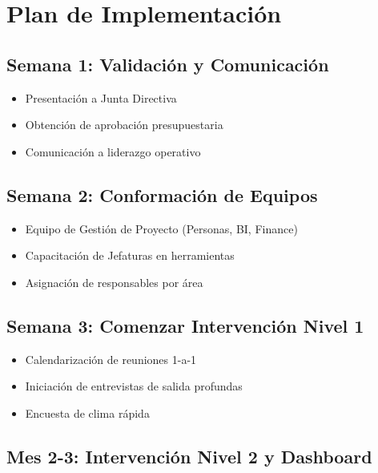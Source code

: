 \documentclass[11pt,a4paper,twoside]{article}
\begin{document}
\newpage

\section{Plan de Implementación}

\subsection{Semana 1: Validación y Comunicación}

\begin{itemize}
    \item Presentación a Junta Directiva
    \item Obtención de aprobación presupuestaria
    \item Comunicación a liderazgo operativo
\end{itemize}

\subsection{Semana 2: Conformación de Equipos}

\begin{itemize}
    \item Equipo de Gestión de Proyecto (Personas, BI, Finance)
    \item Capacitación de Jefaturas en herramientas
    \item Asignación de responsables por área
\end{itemize}

\subsection{Semana 3: Comenzar Intervención Nivel 1}

\begin{itemize}
    \item Calendarización de reuniones 1-a-1
    \item Iniciación de entrevistas de salida profundas
    \item Encuesta de clima rápida
\end{itemize}

\subsection{Mes 2-3: Intervención Nivel 2 y Dashboard}
\end{document}
